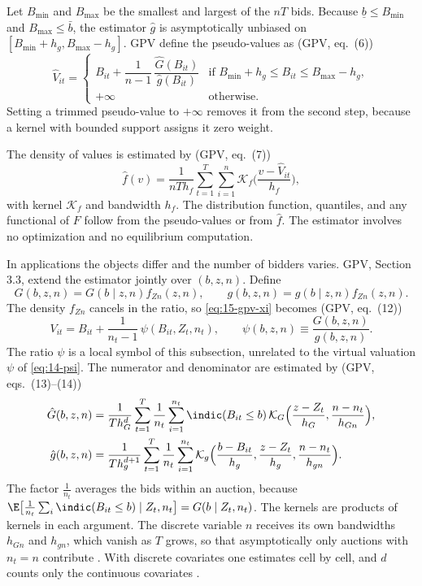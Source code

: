  Let $B_{\min}$ and $B_{\max}$ be the smallest and largest of the $nT$ bids. Because $\underline b\le B_{\min}$ and $B_{\max}\le\bar b$, the estimator $\hat g$ is asymptotically unbiased on $[B_{\min}+h_g,B_{\max}-h_g]$. GPV define the pseudo-values as (GPV, eq.~(6))
\begin{equation}\label{eq:15-gpv-trim}
\hat V_{it}=\begin{cases}
B_{it}+\dfrac{1}{n-1}\,\dfrac{\hat G(B_{it})}{\hat g(B_{it})}&\text{if }B_{\min}+h_g\le B_{it}\le B_{\max}-h_g,\\[2ex]
+\infty&\text{otherwise.}
\end{cases}
\end{equation}
Setting a trimmed pseudo-value to $+\infty$ removes it from the second step, because a kernel with bounded support assigns it zero weight.

 The density of values is estimated by (GPV, eq.~(7))
\begin{equation}\label{eq:15-gpv-fhat}
\hat f(v)=\frac{1}{nTh_f}\sum_{t=1}^T\sum_{i=1}^n\mathcal K_f\Big(\frac{v-\hat V_{it}}{h_f}\Big),
\end{equation}
with kernel $\mathcal K_f$ and bandwidth $h_f$. The distribution function, quantiles, and any functional of $F$ follow from the pseudo-values or from $\hat f$. The estimator involves no optimization and no equilibrium computation.

 In applications the objects differ and the number of bidders varies. GPV, Section 3.3, extend the estimator jointly over $(b,z,n)$. Define
\[
G(b,z,n)=G(b\mid z,n)f_{Zn}(z,n),\qquad g(b,z,n)=g(b\mid z,n)f_{Zn}(z,n).
\]
The density $f_{Zn}$ cancels in the ratio, so \eqref{eq:15-gpv-xi} becomes (GPV, eq.~(12))
\begin{equation}\label{eq:15-gpv-psi}
V_{it}=B_{it}+\frac{1}{n_t-1}\,\psi(B_{it},Z_t,n_t),\qquad\psi(b,z,n)\equiv\frac{G(b,z,n)}{g(b,z,n)}.
\end{equation}
The ratio $\psi$ is a local symbol of this subsection, unrelated to the virtual valuation $\psi$ of \eqref{eq:14-psi}. The numerator and denominator are estimated by (GPV, eqs.~(13)--(14))
\begin{align}
\hat G(b,z,n)&=\frac{1}{Th_G^d}\sum_{t=1}^T\frac{1}{n_t}\sum_{i=1}^{n_t}\indic(B_{it}\le b)\,\mathcal K_G\Big(\frac{z-Z_t}{h_G},\frac{n-n_t}{h_{Gn}}\Big),\label{eq:15-gpv-Ghat-z}\\
\hat g(b,z,n)&=\frac{1}{Th_g^{d+1}}\sum_{t=1}^T\frac{1}{n_t}\sum_{i=1}^{n_t}\mathcal K_g\Big(\frac{b-B_{it}}{h_g},\frac{z-Z_t}{h_g},\frac{n-n_t}{h_{gn}}\Big).\label{eq:15-gpv-ghat-z}
\end{align}
The factor $\frac{1}{n_t}$ averages the bids within an auction, because $\E\big[\frac{1}{n_t}\sum_i\indic(B_{it}\le b)\mid Z_t,n_t\big]=G(b\mid Z_t,n_t)$. The kernels are products of kernels in each argument. The discrete variable $n$ receives its own bandwidths $h_{Gn}$ and $h_{gn}$, which vanish as $T$ grows, so that asymptotically only auctions with $n_t=n$ contribute \citep{Bierens1987}. With discrete covariates one estimates cell by cell, and $d$ counts only the continuous covariates \citep[footnote 12]{GuerrePerrigneVuong2000}.

